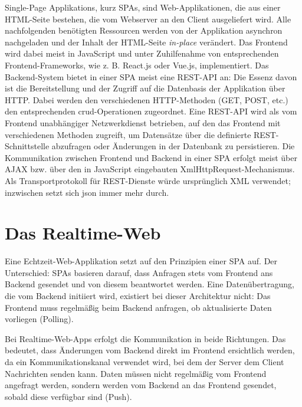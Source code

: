 Single-Page Applikations, kurz SPAs, sind Web-Applikationen, die aus
einer HTML-Seite bestehen, die vom Webserver an den Client ausgeliefert
wird. Alle nachfolgenden benötigten Ressourcen werden von der
Applikation asynchron nachgeladen und der Inhalt der HTML-Seite
\emph{in-place} verändert. Das Frontend wird dabei meist in JavaScript
und unter Zuhilfenahme von entsprechenden Frontend-Frameworks, wie z. B.
React.js oder Vue.js, implementiert. Das Backend-System bietet in einer
SPA meist eine REST-API an: Die Essenz davon ist die Bereitstellung und
der Zugriff auf die Datenbasis der Applikation über HTTP. Dabei werden
den verschiedenen HTTP-Methoden (GET, POST, etc.) den entsprechenden
\acrshort{crud}-Operationen zugeordnet. Eine REST-API wird als vom Frontend
unabhängiger Netzwerkdienst betrieben, auf den das Frontend mit
verschiedenen Methoden zugreift, um Datensätze über die definierte
REST-Schnittstelle abzufragen oder Änderungen in der Datenbank zu
persistieren. Die Kommunikation zwischen Frontend und Backend in einer
SPA erfolgt meist über AJAX bzw. über den in JavaScript eingebauten
XmlHttpRequest-Mechanismus. Als Transportprotokoll für REST-Dienste
würde ursprünglich XML verwendet; inzwischen setzt sich \acrshort{json}
immer mehr durch.


\section{Das Realtime-Web}\label{das-realtime-web}

Eine Echtzeit-Web-Applikation setzt auf den Prinzipien einer SPA auf.
Der Unterschied: SPAs basieren darauf, dass Anfragen stets vom Frontend
ans Backend gesendet und von diesem beantwortet werden. Eine
Datenübertragung, die vom Backend initiiert wird, existiert bei dieser
Architektur nicht: Das Frontend muss regelmäßig beim Backend anfragen,
ob aktualisierte Daten vorliegen (Polling).

Bei Realtime-Web-Apps erfolgt die Kommunikation in beide Richtungen. Das
bedeutet, dass Änderungen vom Backend direkt im Frontend ersichtlich
werden, da ein Kommunikationskanal verwendet wird, bei dem der Server
dem Client Nachrichten senden kann. Daten müssen nicht regelmäßig vom
Frontend angefragt werden, sondern werden vom Backend an das Frontend
gesendet, sobald diese verfügbar sind (Push).

